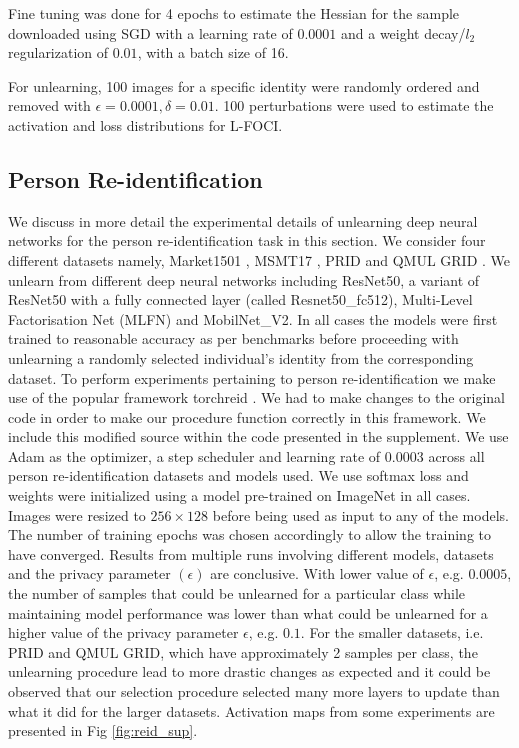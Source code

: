 Fine tuning was done for 4 epochs to estimate the Hessian for the sample downloaded using SGD with a learning rate of $0.0001$ and a weight decay/$l_2$ regularization of $0.01$, with a batch size of 16.

For unlearning, 100 images for a specific identity were randomly ordered and removed with $\epsilon=0.0001, \delta=0.01$. 100 perturbations were used to estimate the activation and loss distributions for L-FOCI.

\subsection{Person Re-identification}
We discuss in more detail the experimental details of unlearning deep neural networks for the person re-identification task in this section. We consider four different datasets namely, Market1501 \cite{zheng2015scalable}, MSMT17 \cite{wei2018person}, PRID \cite{hirzer11} and  QMUL GRID \cite{loy2009multi}. We unlearn from different deep neural networks including ResNet50, a variant of ResNet50 with a fully connected layer (called Resnet50\_fc512), Multi-Level Factorisation Net (MLFN) and MobilNet\_V2. In all cases the models were first trained to reasonable accuracy as per benchmarks before proceeding with unlearning a randomly selected individual's identity from the corresponding dataset. To perform experiments pertaining to person re-identification we make use of the popular framework torchreid \cite{zhou2019omni}. We had to make changes to the original code in order to make our procedure function correctly in this framework. We include this modified source within the code presented in the supplement. We use Adam as the optimizer, a step scheduler and learning rate of $0.0003$ across all person re-identification datasets and models used. We use softmax loss and weights were initialized using a model pre-trained on ImageNet in all cases. Images were resized to $256 \times 128$ before being used as input to any of the models. The number of training epochs was chosen accordingly to allow the training to have converged. Results from multiple runs involving different models, datasets and the privacy parameter $(\epsilon)$ are conclusive. With lower value of $\epsilon$, e.g. $0.0005$, the number of samples that could be unlearned for a particular class while maintaining model performance was lower than what could be unlearned for a higher value of the privacy parameter $\epsilon$, e.g. $0.1$. For the smaller datasets, i.e. PRID and QMUL GRID, which have approximately 2 samples per class, the unlearning procedure lead to more drastic changes as expected and it could be observed that our selection procedure selected many more layers to update than what it did for the larger datasets. Activation maps from some experiments are presented in Fig \ref{fig:reid_sup}.

